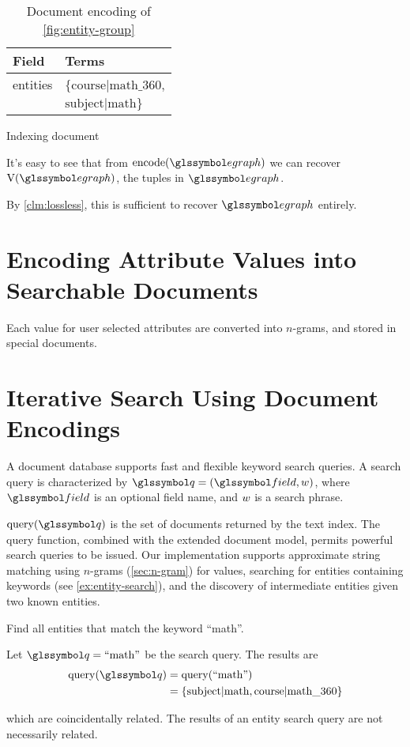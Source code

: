 \begin{ex}
\begin{table}
\begin{subtable}[b]{0.33\linewidth}
					\begin{tabular}{ll}
						\toprule
						Field & Terms \\
						\midrule
						entities & \(\{\text{course|math\_360}\), \\
						& \(\text{subject|math}\}\) \\
						\bottomrule
					\end{tabular}
					
					\caption{Indexing document}
				\end{subtable}
				
				\caption{Document encoding of \vref{fig:entity-group}}
				\label{tbl:document-encoding}
			\end{table}
		\end{ex}
		
		It's easy to see that from \(\text{encode}(\egraph)\) we can recover \(\text{V}(\egraph)\), the tuples in \(\egraph\).
		
		By \vref{clm:lossless}, this is sufficient to recover \(\egraph\) entirely.
	
	\section{Encoding Attribute Values into Searchable Documents}
		Each value for user selected attributes are converted into \(n\)-grams, and stored in special documents.
	
	\section{Iterative Search Using Document Encodings}
		A document database supports fast and flexible keyword search queries.	A search query is characterized by \(\q = (\field, \w)\), where \(\field\) is an optional field name, and \(w\) is a search phrase.
		
		\(\query(\q)\) is the set of documents returned by the text index.  The query function, combined with the extended document model, permits powerful search queries to be issued.  Our implementation supports approximate string matching using \(n\)-grams (\cref{sec:n-gram}) for values, searching for entities containing keywords (see \vref{ex:entity-search}), and the discovery of intermediate entities given two known entities.
		
		\begin{ex}
		\label{ex:entity-search}
			Find all entities that match the keyword ``math''.
			
			Let \(\q = \text{``math''}\) be the search query.  The results are
			\begin{align*}
				\query(\q) &= \query(\text{``math''}) \\
				&= \{\text{subject|math}, \text{course|math\_360}\}
			\end{align*}
			
			which are coincidentally related.  The results of an entity search query are not necessarily related.
		\end{ex}
		
